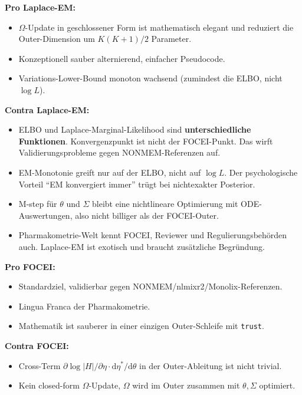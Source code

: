 \documentclass[
]{article}
\providecommand{\tightlist}{%
  \setlength{\itemsep}{0pt}\setlength{\parskip}{0pt}}
\begin{document}
\textbf{Pro Laplace-EM:}

\begin{itemize}
\tightlist
\item
  \(\Omega\)-Update in geschlossener Form ist mathematisch elegant und
  reduziert die Outer-Dimension um \(K(K+1)/2\) Parameter.
\item
  Konzeptionell sauber alternierend, einfacher Pseudocode.
\item
  Variations-Lower-Bound monoton wachsend (zumindest die ELBO, nicht
  \(\log L\)).
\end{itemize}

\textbf{Contra Laplace-EM:}

\begin{itemize}
\tightlist
\item
  ELBO und Laplace-Marginal-Likelihood sind \textbf{unterschiedliche
  Funktionen}. Konvergenzpunkt ist nicht der FOCEI-Punkt. Das wirft
  Validierungsprobleme gegen NONMEM-Referenzen auf.
\item
  EM-Monotonie greift nur auf der ELBO, nicht auf \(\log L\). Der
  psychologische Vorteil ``EM konvergiert immer'' trügt bei nichtexakter
  Posterior.
\item
  M-step für \(\theta\) und \(\Sigma\) bleibt eine nichtlineare
  Optimierung mit ODE-Auswertungen, also nicht billiger als der
  FOCEI-Outer.
\item
  Pharmakometrie-Welt kennt FOCEI, Reviewer und Regulierungsbehörden
  auch. Laplace-EM ist exotisch und braucht zusätzliche Begründung.
\end{itemize}

\textbf{Pro FOCEI:}

\begin{itemize}
\tightlist
\item
  Standardziel, validierbar gegen NONMEM/nlmixr2/Monolix-Referenzen.
\item
  Lingua Franca der Pharmakometrie.
\item
  Mathematik ist sauberer in einer einzigen Outer-Schleife mit
  \texttt{trust}.
\end{itemize}

\textbf{Contra FOCEI:}

\begin{itemize}
\tightlist
\item
  Cross-Term
  \(\partial \log|H|/\partial \eta \cdot \mathrm{d}\eta^*/\mathrm{d}\theta\)
  in der Outer-Ableitung ist nicht trivial.
\item
  Kein closed-form \(\Omega\)-Update, \(\Omega\) wird im Outer zusammen
  mit \(\theta, \Sigma\) optimiert.
\end{itemize}
\end{document}
